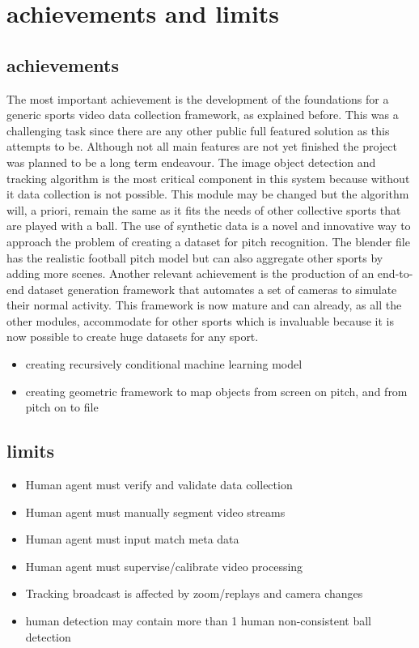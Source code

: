 \documentclass[
11pt,
twoside
]{report}
\begin{document}
\section{achievements and limits}

\subsection{achievements}


The most important achievement is the development of the foundations for a generic sports video data collection framework, as explained before. This was a challenging task since there are any other public full featured solution as this attempts to be. Although not all main features are not yet finished the project was planned to be a long term endeavour.
The image object detection and tracking algorithm is the most critical component in this system because without it data collection is not possible. This module may be changed but the algorithm will, a priori, remain the same as it fits the needs of other collective sports that are played with a ball.
The use of synthetic data is a novel and innovative way to approach the problem of creating a dataset for pitch recognition. The blender file has the realistic football pitch model but can also aggregate other sports by adding more scenes.
Another relevant achievement is the production of an end-to-end dataset generation framework that automates a set of cameras to simulate their normal activity. This framework is now mature and can already, as all the other modules, accommodate for other sports which is invaluable because it is now possible to create huge datasets for any sport.



\begin{itemize}
\item
creating recursively conditional machine learning model
\item
creating geometric framework to map objects from screen on pitch, and from pitch on to file
\end{itemize}


\subsection{limits}


\begin{itemize}
\item
  Human agent must verify and validate data collection
\item
  Human agent must manually segment video streams
\item
  Human agent must input match meta data
\item
  Human agent must supervise/calibrate video processing
\item
  Tracking broadcast is affected by zoom/replays and camera changes
\item
  human detection may contain more than 1 human non-consistent ball detection
\end{itemize}
\end{document}
